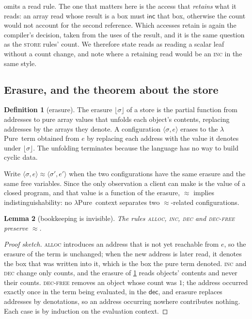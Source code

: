 \documentclass[11pt,a4paper]{article}
\theoremstyle{definition}
\newtheorem{definition}{Definition}[section]
\theoremstyle{plain}
\newtheorem{lemma}[definition]{Lemma}
\newcommand{\lpure}{\textup{$\lambda$Pure}}
\newcommand{\ers}[1]{\lfloor #1 \rfloor}
\newcommand{\cm}{\mathrel{\approx}}
\begin{document}
 omits a read rule. The one that matters here is the access that
\emph{retains} what it reads: an array read whose result is a box must
$\mathsf{inc}$ that box, otherwise the count would not account for the second
reference. Which accesses retain is again the compiler's decision, taken from
the uses of the result, and it is the same question as the \textup{\textsc{store}} rules'
count. We therefore state reads as reading a scalar leaf without a count change,
and note where a retaining read would be an \textup{\textsc{inc}} in the same style.

\subsection{Erasure, and the theorem about the store}

\begin{definition}[erasure]\label{def:erasure}
The erasure $\ers{\sigma}$ of a store is the partial function from addresses to
pure array values that unfolds each object's contents, replacing addresses by
the arrays they denote. A configuration $\langle \sigma, e \rangle$ erases to the
\lpure\ term obtained from $e$ by replacing each address with the value it
denotes under $\ers{\sigma}$. The unfolding terminates because the language has
no way to build cyclic data.
\end{definition}

Write $\langle \sigma, e \rangle \cm \langle \sigma', e' \rangle$ when the two
configurations have the same erasure and the same free variables. Since the only
observation a client can make is the value of a closed program, and that value
is a function of the erasure, $\cm$ implies indistinguishability: no \lpure\
context separates two $\cm$-related configurations.

\begin{lemma}[bookkeeping is invisible]\label{lem:bookkeeping}
The rules \textup{\textsc{alloc}}, \textup{\textsc{inc}}, \textup{\textsc{dec}} and \textup{\textsc{dec-free}}
preserve $\cm$.
\end{lemma}

\begin{proof}[Proof sketch]
\textup{\textsc{alloc}} introduces an address that is not yet reachable from $e$, so the
erasure of the term is unchanged; when the new address is later read, it denotes
the box that was written into it, which is the box the pure term denoted.
\textup{\textsc{inc}} and \textup{\textsc{dec}} change only counts, and the erasure of
\cref{def:erasure} reads objects' contents and never their counts.
\textup{\textsc{dec-free}} removes an object whose count was $1$; the address occurred
exactly once in the term being evaluated, in the $\mathsf{dec}$, and erasure
replaces addresses by denotations, so an address occurring nowhere contributes
nothing. Each case is by induction on the evaluation context.
\end{proof}
\end{document}
